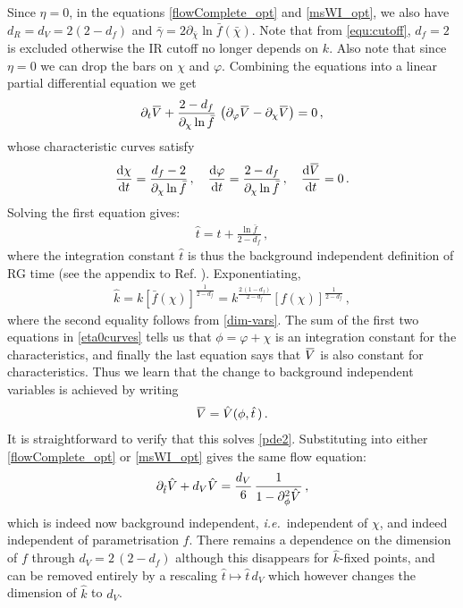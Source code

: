 \documentclass[11pt]{book}
\newcommand{\overbar}[1]{\mkern 1.5mu\overline{\mkern-1.5mu#1\mkern-1.5mu}\mkern 1.5mu}
\newcommand{\bV}{\overbar V}
\newcommand\ie{\textit{i.e.}\ }
\newcommand{\vp}{\varphi}
\newcommand{\bc}{\bar \chi}
\newcommand{\hV}{\hat V}
\newcommand{\hk}{\hat k}
\newcommand{\hatt}{\hat t}
\numberwithin{equation}{chapter}
\begin{document}
Since $\eta=0$, in the equations \eqref{flowComplete_opt} and \eqref{msWI_opt},
we also have $d_R=d_V=2(2-d_f)$ and $\bar{\gamma}=2\partial_{\bc}\ln\bar{f}(\bc)$.
Note that from \eqref{equ:cutoff}, $d_f=2$ is excluded otherwise the IR cutoff no longer depends on $k$.
Also note that since $\eta=0$ we can drop the bars on $\chi$ and $\vp$.
Combining the equations into a linear partial differential equation we get
\begin{align}
  \label{pde2}
  \partial_t\bV +\frac{2-d_f}{\partial_{\chi}\ln\bar{f}} \,
  \left(\partial_{\vp}\bV-\partial_{\chi}\bV\right) =0\,,
\end{align}
whose characteristic curves satisfy
\begin{align}
  \label{eta0curves}
  \frac{\mathrm d\chi}{\mathrm dt}=\frac{d_f-2}{\partial_{\chi}\ln\bar{f}}\,,
  \quad
  \frac{\mathrm d\vp}{\mathrm dt}=\frac{2-d_f}{\partial_{\chi}\ln\bar{f}}\,,
  \quad
  \frac{\mathrm d\bV}{\mathrm dt}=0\,.
\end{align}
Solving the first equation gives:
\begin{align}
  \label{hatt}
  \hatt = t+\frac{\ln\bar{f}}{2-d_f}\,,
\end{align}
where the integration constant $\hatt$ is thus the background independent definition of RG time
(see the appendix to Ref. \cite{Dietz:2015owa}). Exponentiating,
\begin{align}
  \hk = k \left[ \bar{f}(\chi) \right]^{\frac{1}{2-d_f}} = k^{\frac{2\,(1-d_f)}{2-d_f}}
  \left[ f(\chi) \right]^{\frac{1}{2-d_f}}\,,
\end{align}
where the second equality follows from \eqref{dim-vars}.
The sum of the first two equations in \eqref{eta0curves} tells us that $\phi=\vp+\chi$ is an
integration constant for the characteristics,
and finally the last equation says that $\bV$ is also constant for characteristics.
Thus we learn that the change to background independent variables is achieved by writing
\begin{align}
  \label{background-independent}
  \bV = \hV(\phi,\hatt\,)\,.
\end{align}
It is straightforward to verify that this solves \eqref{pde2}.
Substituting into either \eqref{flowComplete_opt} or \eqref{msWI_opt} gives the same flow equation:
\begin{align}
  \label{bi-flow}
  \partial_{\hatt}\hV +d_V\hV = \frac{d_V}{6} \, \frac{1}{1-\partial^2_\phi\hV^{\vphantom{H^H}}}\,,
\end{align}
which is indeed now background independent, \ie independent of $\chi$,
and indeed independent of parametrisation $f$.
There remains a dependence on the dimension of $f$ through $d_V = 2\,(2-d_f)$ although this disappears
for $\hk$-fixed points, and can be removed entirely by a rescaling $\hatt\mapsto \hatt\, d_V$ which however
changes the dimension of $\hat{k}$ to $d_V$.
\end{document}

